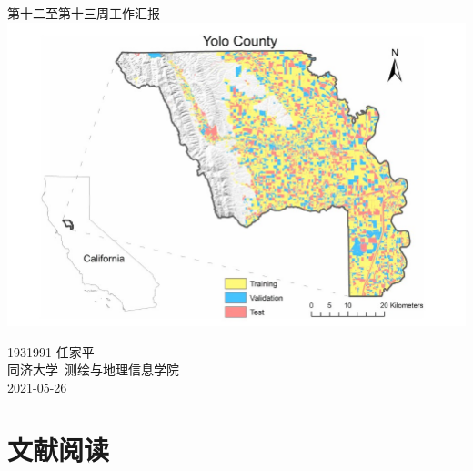 \documentclass[a4paper, 12pt]{article}
\begin{document}
\begin{center}
    {\Huge 
        第十二至第十三周工作汇报}\\[20pt]
    
    \includegraphics[width=1.0\textwidth]{pic/cover.jpg}  

    {\Large 
        1931991 任家平\\[12pt]
        同济大学~测绘与地理信息学院\\[12pt]
        2021-05-26}
\end{center}
\thispagestyle{empty}



\newpage
{}
\tableofcontents
\newpage
{}
\part{文献阅读}




\newpage
\nocite{*}


\end{document}
